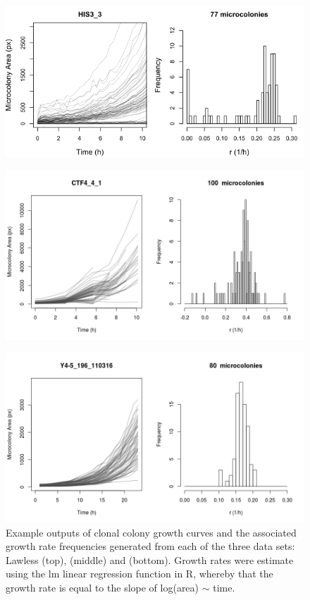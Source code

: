 \documentclass{bioinfo}
\begin{document}
\vspace{-1em}
\begin{figure}[H]
\includegraphics[width=1\linewidth]{LawlessExampleOutput.png}
\end{figure}
\vspace{-3em}
\begin{figure}[H]
\includegraphics[width=1\linewidth]{LevyExampleOutput1.png}
\end{figure}
\vspace{-3em}
\begin{figure}[H]
\includegraphics[width=1\linewidth]{ZivExampleOutput1.png}
\caption{Example outputs of clonal colony growth curves and the associated growth rate frequencies generated from each of the three data sets: Lawless (top), \citealp{Levy12} (middle) and \citealp{Ziv13} (bottom). Growth rates were estimate using the lm linear regression function in R, whereby that the growth rate is equal to the slope of log(area) $\sim$ time.}
\label{fig:ExampleOutput}
\end{figure}
\vspace{-3em}
\end{document}
